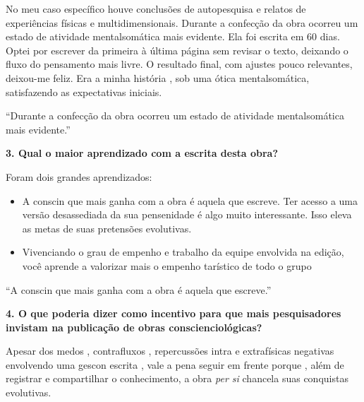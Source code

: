\documentclass{gescons}
\begin{document}
\begin{multicols}{2}
No meu caso específico houve conclusões de autopesquisa e relatos de experiências físicas e multidimensionais. Durante a confecção da obra ocorreu um estado de atividade mentalsomática mais evidente. Ela foi escrita em 60 dias. Optei por escrever da primeira à última página sem  revisar o texto, deixando o fluxo do pensamento mais livre. O resultado final, com ajustes pouco relevantes, deixou-me feliz. Era a minha  história , sob uma ótica mentalsomática, satisfazendo as expectativas iniciais.

\begin{pullquote}
    ``Durante a confecção da obra ocorreu um estado de atividade mentalsomática mais evidente.''
\end{pullquote}


\textbf{3.       Qual o maior aprendizado com a escrita desta obra?}

Foram dois grandes aprendizados:

\begin{itemize}
\item
  A conscin que mais ganha com a obra é aquela que escreve. Ter acesso a uma versão desassediada da sua pensenidade é algo muito interessante. Isso eleva as metas de suas pretensões evolutivas.
\item
  Vivenciando o grau de empenho e trabalho da equipe envolvida na edição, você aprende a valorizar mais o empenho tarístico de todo o grupo
\end{itemize}

\begin{pullquote}
    ``A conscin que mais ganha com a obra é aquela que escreve.''
\end{pullquote}


\textbf{4.       O que poderia dizer como incentivo para que mais pesquisadores invistam na publicação de obras conscienciológicas?}

Apesar dos medos , contrafluxos , repercussões intra e extrafísicas negativas envolvendo uma gescon escrita , vale a pena seguir em frente porque , além de registrar e compartilhar o conhecimento, a obra \emph{per si} chancela suas conquistas evolutivas. 



    


    \end{multicols}
\end{document}
